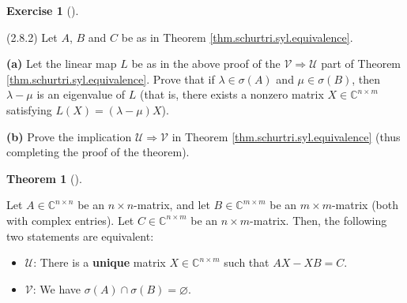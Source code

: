 \documentclass[numbers=enddot,12pt,final,onecolumn,notitlepage]{scrartcl}
\newcounter{exer}
\theoremstyle{definition}
\newtheorem{theo}{Theorem}[subsection]
\newenvironment{theorem}[1][]
{\begin{theo}[#1]\begin{leftbar}}
        {\end{leftbar}\end{theo}}
\newtheorem{exmp}[exer]{Exercise}
\newenvironment{exercise}[1][]
{\begin{exmp}[#1]\begin{leftbar}}
        {\end{leftbar}\end{exmp}}
\begin{document}
\begin{exercise}
	\label{exe.schurtri.syl.sigA-B} (2.8.2) Let $A$, $B$ and $C$ be as in Theorem
	\ref{thm.schurtri.syl.equivalence}. \medskip

	\textbf{(a)} Let the linear map $L$ be as in the above proof of the
	$\mathcal{V}\Longrightarrow\mathcal{U}$ part of Theorem
	\ref{thm.schurtri.syl.equivalence}. Prove that if $\lambda\in\sigma\left(
		A\right)  $ and $\mu\in\sigma\left(  B\right)  $, then $\lambda-\mu$ is an
	eigenvalue of $L$ (that is, there exists a nonzero matrix $X\in\mathbb{C}%
		^{n\times m}$ satisfying $L\left(  X\right)  =\left(  \lambda-\mu\right)  X$).
	\medskip

	\textbf{(b)} Prove the implication $\mathcal{U}\Longrightarrow\mathcal{V}$ in
	Theorem \ref{thm.schurtri.syl.equivalence} (thus completing the proof of the theorem).

	\begin{theorem}
		\label{thm.schurtri.syl.equivalence}Let $A\in\mathbb{C}^{n\times n}$ be an
		$n\times n$-matrix, and let $B\in\mathbb{C}^{m\times m}$ be an $m\times
			m$-matrix (both with complex entries). Let $C\in\mathbb{C}^{n\times m}$ be an
		$n\times m$-matrix. Then, the following two statements are equivalent:

		\begin{itemize}
			\item $\mathcal{U}$: There is a \textbf{unique} matrix $X\in\mathbb{C}%
				      ^{n\times m}$ such that $AX-XB=C$.

			\item $\mathcal{V}$: We have $\sigma\left(  A\right)  \cap\sigma\left(
				      B\right)  =\varnothing$.
		\end{itemize}
	\end{theorem}
\end{exercise}
\end{document}
